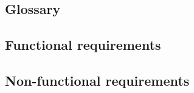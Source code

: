 \subsection{Glossary}


\subsection{Functional requirements}


\subsection{Non-functional requirements}
